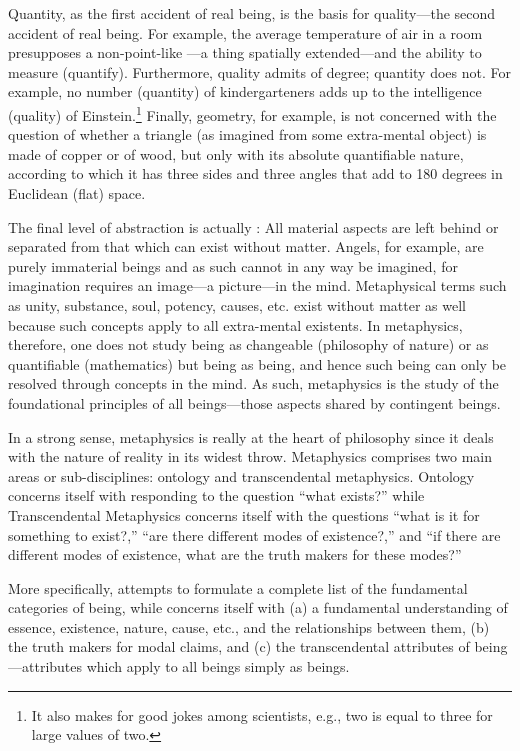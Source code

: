Quantity, as the first accident of real being, is the basis for quality---the second accident of real being. For example, the average temperature of air in a room presupposes a non-point-like ---a thing spatially extended---and the ability to measure (quantify). Furthermore, quality admits of degree; quantity does not. For example, no number (quantity) of kindergarteners adds up to the intelligence (quality) of Einstein.\footnote{It also makes for good jokes among scientists, e.g., two is equal to three for large values of two.} Finally, geometry, for example, is not concerned with the question of whether a triangle (as imagined from some extra-mental object) is made of copper or of wood, but only with its absolute quantifiable nature, according to which it has three sides and three angles that add to 180 degrees in Euclidean (flat) space.

The final level of abstraction is actually : All material aspects are left behind or separated from that which can exist without matter. Angels, for example, are purely immaterial beings and as such cannot in any way be imagined, for imagination requires an image---a picture---in the mind. Metaphysical terms such as unity, substance, soul, potency, causes, etc. exist without matter as well because such concepts apply to all extra-mental existents. In metaphysics, therefore, one does not study being as changeable (philosophy of nature) or as quantifiable (mathematics) but being as being, and hence such being can only be resolved through concepts in the mind. As such, metaphysics is the study of the foundational principles of all beings---those aspects shared by  contingent beings.

In a strong sense, metaphysics is really at the heart of philosophy since it deals with the nature of reality in its widest throw. Metaphysics comprises two main areas or sub-disciplines: ontology and transcendental metaphysics. Ontology concerns itself with responding to the question ``what exists?'' while Transcendental Metaphysics concerns itself with the questions ``what is it for something to exist?,'' ``are there different modes of existence?,'' and ``if there are different modes of existence, what are the truth makers for these modes?'' 

More specifically,  attempts to formulate a complete list of the fundamental categories of being, while  concerns itself with (a) a fundamental understanding of essence, existence, nature, cause, etc., and the relationships between them, (b) the truth makers for modal claims, and (c) the transcendental attributes of being---attributes which apply to all beings simply as beings.


